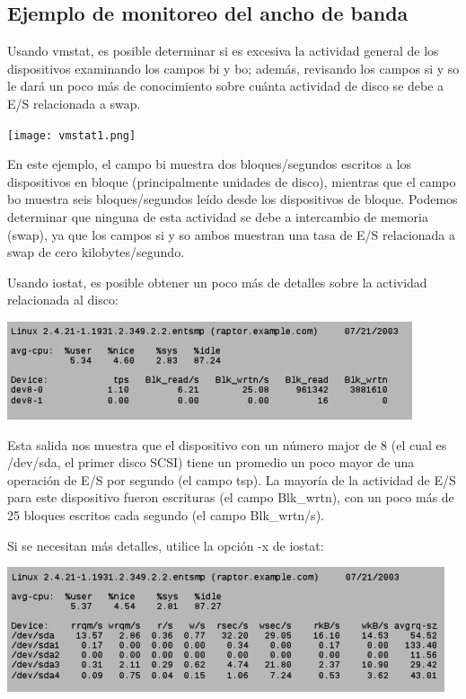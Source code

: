 \documentclass[12pt]{article}
\begin{document}
\subsection*{Ejemplo de monitoreo del ancho de banda}

Usando vmstat, es posible determinar si es excesiva la actividad general de los dispositivos examinando los campos bi y bo; además, revisando los campos si y so le dará un poco más de conocimiento sobre cuánta actividad de disco se debe a E/S relacionada a swap.

\begin{center}
 \texttt{[image: vmstat1.png]}
\end{center}

        
En este ejemplo, el campo bi muestra dos bloques/segundos escritos a los dispositivos en bloque (principalmente unidades de disco), mientras que el campo bo muestra seis bloques/segundos leído desde los dispositivos de bloque. Podemos determinar que ninguna de esta actividad se debe a intercambio de memoria (swap), ya que los campos si y so ambos muestran una tasa de E/S relacionada a swap de cero kilobytes/segundo.

Usando iostat, es posible obtener un poco más de detalles sobre la actividad relacionada al disco:

\begin{center}
 \includegraphics{iostat1.png}
\end{center}

Esta salida nos muestra que el dispositivo con un número major de 8 (el cual es /dev/sda, el primer disco SCSI) tiene un promedio un poco mayor de una operación de E/S por segundo (el campo tsp). La mayoría de la actividad de E/S para este dispositivo fueron escrituras (el campo Blk\_wrtn), con un poco más de 25 bloques escritos cada segundo (el campo Blk\_wrtn/s).

Si se necesitan más detalles, utilice la opción -x de iostat:

\begin{center}
 \includegraphics{iostat2.png}
\end{center}
\end{document}
